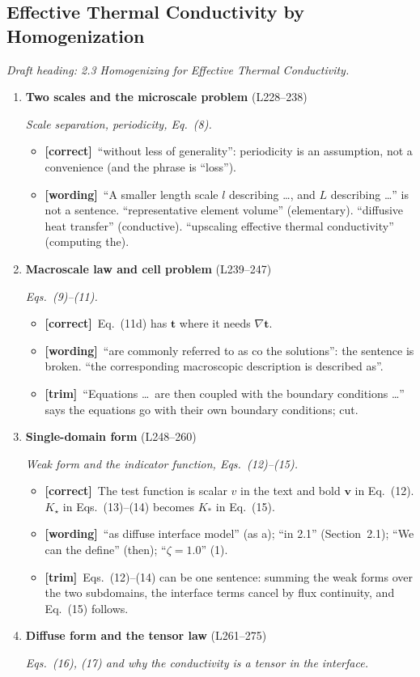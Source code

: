 \documentclass[11pt]{article}
\newcommand{\Pg}[3]{\item \textbf{#1} {\small(#2)}\par\textit{#3}}
\newcommand{\tC}{\textcolor{miss}{\textbf{[correct]}}\ }
\newcommand{\tG}{\textcolor{stale}{\textbf{[wording]}}\ }
\newcommand{\tT}{\textcolor{cut}{\textbf{[trim]}}\ }
\begin{document}
\subsection{Effective Thermal Conductivity by Homogenization}
\textit{Draft heading: 2.3 Homogenizing for Effective Thermal Conductivity.}
\begin{enumerate}
\Pg{Two scales and the microscale problem}{L228--238}{Scale separation, periodicity, Eq.~(8).}
  \begin{itemize}
  \item \tC ``without less of generality'': periodicity is an assumption,
    not a convenience (and the phrase is ``loss'').
  \item \tG ``A smaller length scale $l$ describing \ldots, and $L$
    describing \ldots'' is not a sentence. ``representative element
    volume'' (elementary). ``diffusive heat transfer'' (conductive).
    ``upscaling effective thermal conductivity'' (computing the).
  \end{itemize}
\Pg{Macroscale law and cell problem}{L239--247}{Eqs.~(9)--(11).}
  \begin{itemize}
  \item \tC Eq.~(11d) has $\mathbf{t}$ where it needs $\nabla\mathbf{t}$.
  \item \tG ``are commonly referred to as co the solutions'': the sentence
    is broken. ``the corresponding macroscopic description is described
    as''.
  \item \tT ``Equations \ldots\ are then coupled with the boundary conditions
    \ldots'' says the equations go with their own boundary conditions; cut.
  \end{itemize}
\Pg{Single-domain form}{L248--260}{Weak form and the indicator function, Eqs.~(12)--(15).}
  \begin{itemize}
  \item \tC The test function is scalar $v$ in the text and bold
    $\mathbf{v}$ in Eq.~(12). $K_\star$ in Eqs.~(13)--(14) becomes $K_{*}$
    in Eq.~(15).
  \item \tG ``as diffuse interface model'' (as a); ``in 2.1'' (Section~2.1);
    ``We can the define'' (then); ``$\zeta = 1.0$'' (1).
  \item \tT Eqs.~(12)--(14) can be one sentence: summing the weak forms over
    the two subdomains, the interface terms cancel by flux continuity, and
    Eq.~(15) follows.
  \end{itemize}
\Pg{Diffuse form and the tensor law}{L261--275}{Eqs.~(16), (17) and why the conductivity is a tensor in the interface.}

\end{enumerate}
\end{document}
